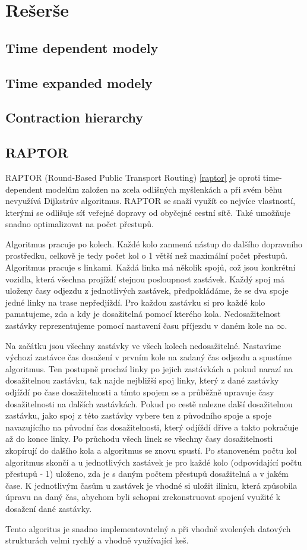 \section{Rešerše}
\subsection{Time dependent modely}
\subsection{Time expanded modely}
\subsection{Contraction hierarchy}
\subsection{RAPTOR}
RAPTOR (Round-Based Public Transport Routing) \ref{raptor} je oproti
time-dependent modelům založen na zcela odlišných myšlenkách a při svém běhu
nevyužívá Dijkstrův algoritmus. RAPTOR se snaží využít co nejvíce vlastností,
kterými se odlišuje síť veřejné dopravy od obyčejné cestní sítě. Také umožňuje
snadno optimalizovat na počet přestupů.

Algoritmus pracuje po kolech. Každé kolo zanmená nástup do dalšího dopravního
prostředku, celkově je tedy počet kol o 1 větší než maximální počet přestupů.
Algoritmus pracuje s linkami. Každá linka má několik spojů, což jsou konkrétní
vozidla, která všechna projíždí stejnou posloupnost zastávek. Každý spoj má
uloženy časy odjezdu z jednotlivých zastávek, předpokládáme, že se dva spoje
jedné linky na trase nepředjíždí. Pro každou zastávku si pro každé kolo
pamatujeme, zda a kdy je dosažitelná pomocí kterého kola. Nedosažitelnost
zastávky reprezentujeme pomocí nastavení času příjezdu v daném kole na $\infty$.

Na začátku jsou všechny zastávky ve všech kolech nedosažitelné. Nastavíme
výchozí zastávce čas dosažení v prvním kole na zadaný čas odjezdu a spustíme
algoritmus. Ten postupně prochzí linky po jejich zastávkách a pokud narazí na
dosažitelnou zastávku, tak najde nejbližší spoj linky, který z dané zastávky
odjíždí po čase dosažitelnosti a tímto spojem se  a průběžně upravuje
časy dosažitelnosti na dalších zastávkách. Pokud po cestě nalezne další
dosažitelnou zastávku, jako spoj z této zastávky vybere ten z původního spoje a
spoje navazujícího na původní čas dosažitelnosti, který odjíždí dříve a takto
pokračuje až do konce linky. Po průchodu všech linek se všechny časy
dosažitelnosti zkopírují do dalšího kola a algoritmus se znovu spustí. Po
stanoveném počtu kol algoritmus skončí a u jednotlivých zastávek je pro každé
kolo (odpovídající počtu přestupů - 1) uloženo, zda je s daným počtem přestupů
dosažitelná a v jakém čase. K jednotlivým časům u zastávek je vhodné si uložit
ilinku, která způsobila úpravu na daný čas, abychom byli schopni zrekonstruovat
spojení využité k dosažení dané zastávky. 

Tento algoritus je snadno implementovatelný a při vhodně zvolených datových
strukturách velmi rychlý a vhodně využívající keš. 

